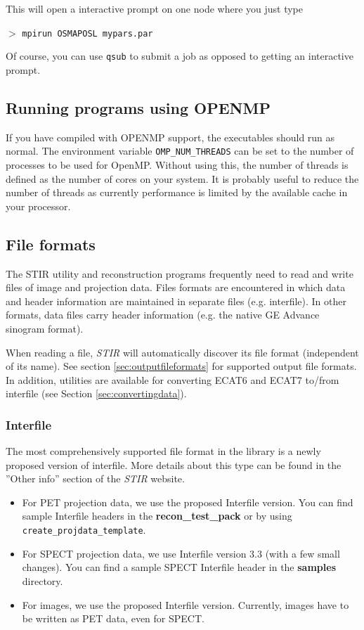 \documentclass{article}
\newcommand{\cmdline}[1]{\par \noindent $>$ \texttt{#1}\par}
\begin{document}
This will open a interactive prompt on one node where you just type

\cmdline{mpirun OSMAPOSL mypars.par}

Of course, you can use \texttt{qsub} to submit a job as opposed to getting an interactive prompt.

\subsection{
Running programs using OPENMP \label{sec:RunningWithOPENMP}}
If you have compiled with OPENMP support, the executables should run as normal.
The environment variable \texttt{OMP\_NUM\_THREADS} can be set to the number of processes to be used for OpenMP. 
Without using this, the number of threads is  defined as the number of cores on your system. It is probably 
useful to reduce the number of threads as currently performance is limited by the available cache in your 
processor.

\subsection{
File formats}

The STIR utility and reconstruction programs frequently need 
to read and write files of image and projection data. Files formats 
are encountered in which data and header information are maintained 
in separate files (e.g. interfile). In other formats, data files 
carry header information (e.g. the native GE Advance sinogram 
format).

When reading a file, \textit{STIR} will automatically discover its file format
(independent of its name). See section \ref{sec:outputfileformats} for supported output file formats. In addition, 
utilities are available for converting ECAT6 and ECAT7 to/from 
interfile (see Section \ref{sec:convertingdata}). 

\subsubsection{Interfile}

The most comprehensively supported file format in the library 
is a newly proposed version of interfile. More details about 
this type can be found in the ''Other info'' section of the \textit{STIR} website.

\begin{itemize}
\item For PET projection data, we use the proposed Interfile version. You can
find sample Interfile headers in the \textbf{recon\_test\_pack} or by using
\texttt{create\_projdata\_template}.

\item For SPECT projection data, we use Interfile version 3.3 (with a few small changes).
You can find a sample SPECT Interfile header in the \textbf{samples} directory.

\item For images, we use the proposed Interfile version. Currently, images have to 
be written as PET data, even for SPECT.
\end{itemize}
\end{document}
